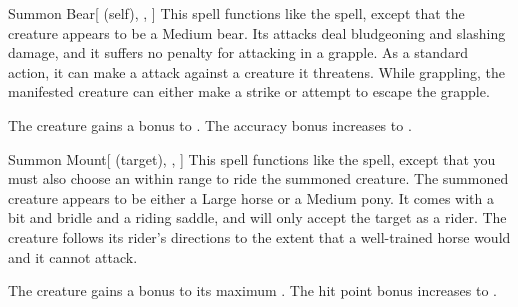 \lowercase{\hypertarget{spell:Summon Bear}{}}\label{spell:Summon Bear}
\begin{attuneability}[Rank 3]{\hypertarget{spell:Summon Bear}{Summon Bear}}[ (self), , ]
This spell functions like the  spell, except that the creature appears to be a Medium bear.
Its attacks deal bludgeoning and slashing damage, and it suffers no penalty for attacking in a grapple.
As a standard action, it can make a  attack against a creature it threatens.
While grappling, the manifested creature can either make a strike or attempt to escape the grapple.

\rankline
{} The creature gains a  bonus to .
 The accuracy bonus increases to .

\end{attuneability}
\vspace{0.25em}



\lowercase{\hypertarget{spell:Summon Mount}{}}\label{spell:Summon Mount}
\begin{attuneability}[Rank 3]{\hypertarget{spell:Summon Mount}{Summon Mount}}[ (target), , ]
This spell functions like the  spell, except that you must also choose an  within \rngmed range to ride the summoned creature.
The summoned creature appears to be either a Large horse or a Medium pony.
It comes with a bit and bridle and a riding saddle, and will only accept the target as a rider.
The creature follows its rider's directions to the extent that a well-trained horse would and it cannot attack.

\rankline
{} The creature gains a  bonus to its maximum .
 The hit point bonus increases to .

\end{attuneability}
\vspace{0.25em}



